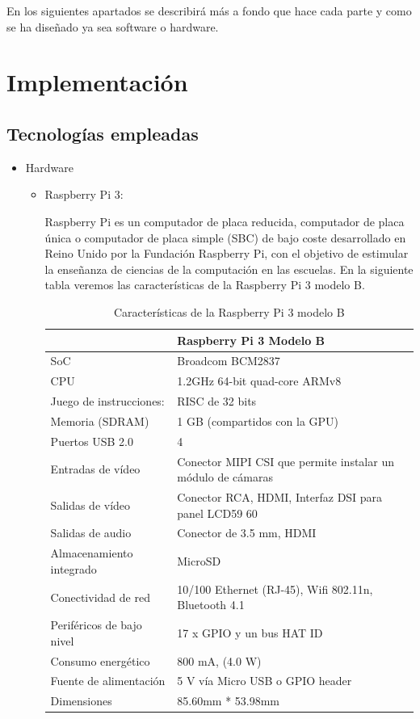 \documentclass{pclass}
\begin{document}
En los siguientes apartados se describirá más a fondo que hace cada parte y como se ha diseñado ya sea software o hardware.
 
\section{Implementación} 
\subsection{Tecnologías empleadas}

\begin{itemize}
	\item Hardware
		\begin{itemize}
			\item Raspberry Pi 3:
			
				\cite{wikiRasp}  Raspberry Pi es un computador de placa reducida, computador de placa única o computador de placa simple (SBC) de bajo coste desarrollado en Reino Unido por la Fundación Raspberry Pi, con el objetivo de estimular la enseñanza de ciencias de la computación en las escuelas. En la siguiente tabla veremos las características de la Raspberry Pi 3 modelo B.
				
				
				\begin{table}[H]
					\begin{center}
						\begin{tabular}{|l|l|}
							\hline
							 & Raspberry Pi 3 Modelo B \\
							\hline \hline
							SoC & Broadcom BCM2837 \\ \hline
							CPU & 1.2GHz 64-bit quad-core ARMv8 \\ \hline
							Juego de instrucciones: & RISC de 32 bits \\ \hline
							Memoria (SDRAM) & 1 GB (compartidos con la GPU) \\ \hline
							Puertos USB 2.0 & 4 \\ \hline
							Entradas de vídeo & Conector MIPI CSI que permite instalar un módulo de cámaras\\ \hline
							Salidas de vídeo & Conector RCA, HDMI, Interfaz DSI para panel LCD59 60 \\ \hline
							Salidas de audio & Conector de 3.5 mm, HDMI \\ \hline
							Almacenamiento integrado & MicroSD \\ \hline
							Conectividad de red & 	10/100 Ethernet (RJ-45), Wifi 802.11n, Bluetooth 4.1 \\ \hline
							Periféricos de bajo nivel & 17 x GPIO y un bus HAT ID \\ \hline
							Consumo energético & 800 mA, (4.0 W) \\ \hline
							Fuente de alimentación & 5 V vía Micro USB o GPIO header \\ \hline
							Dimensiones & 85.60mm * 53.98mm \\ \hline
						\end{tabular}
						\caption{Características de la Raspberry Pi 3 modelo B}
						\label{tabla:raspberry}
					\end{center}
				\end{table}
			

\end{itemize}
\end{itemize}
\end{document}
